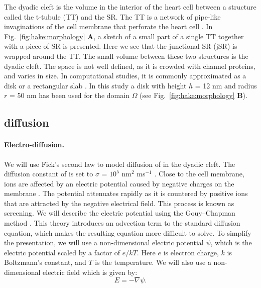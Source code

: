 The dyadic cleft is the volume in the interior of the heart cell
between a structure called the t-tubule (TT) and the SR. The TT is a
network of pipe-like invaginations of the cell membrane that perforate
the heart cell \citep{SoellerCannell1999}. In
Fig.~\ref{fig:hake:morphology} \textbf{A}, a sketch of a small part of
a single TT together with a piece of SR is presented. Here we see that
the junctional SR (jSR) is wrapped around the TT. The small volume
between these two structures is the dyadic cleft. The space is not
well defined, as it is crowded with channel proteins, and varies in
size. In computational studies, it is commonly approximated as a disk
or a rectangular slab
\citep{PeskoffPostLanger1992,SoellerCannell1997,KohSrinivasanChingEtAl2006,
  TanskanenGreensteinChenEtAl2007}. In this study a disk with height
$h$ = 12 nm and radius $r$ = 50 nm has been used for the domain
$\Omega$ (see Fig.~\ref{fig:hake:morphology} \textbf{B}).

\subsection{\Ca diffusion}
\label{sec:hake:ca-diffusion}

\paragraph{Electro-diffusion.}
  
  

We will use Fick's second law to model diffusion of \Ca in the dyadic
cleft. The diffusion constant of \Ca is set to $\sigma$ = $10^5$
nm$^2$ ms$^{-1}$ \citep{LangerPeskoff1996}. Close to the cell membrane,
ions are affected by an electric potential caused by negative charges
on the membrane
\citep{McLaughlinSzaboEisenman1971,LangnerCafisoMarceljaEtAl1990}. The
potential attenuates rapidly as it is countered by positive ions that
are attracted by the negative electrical field. This process is known
as screening. We will describe the electric potential using the
Gouy--Chapman method \citep{Grahame1947}. This theory introduces an
advection term to the standard diffusion equation, which makes the
resulting equation more difficult to solve. To simplify the
presentation, we will use a non-dimensional electric potential $\psi$,
which is the electric potential scaled by a factor of $e/kT$. Here $e$
is electron charge, $k$ is Boltzmann's constant, and $T$ is the
temperature. We will also use a non-dimensional electric field which
is given by:
\begin{equation}
  \label{eq:hake:electric_field}
  E=-\nabla\psi.
\end{equation}

